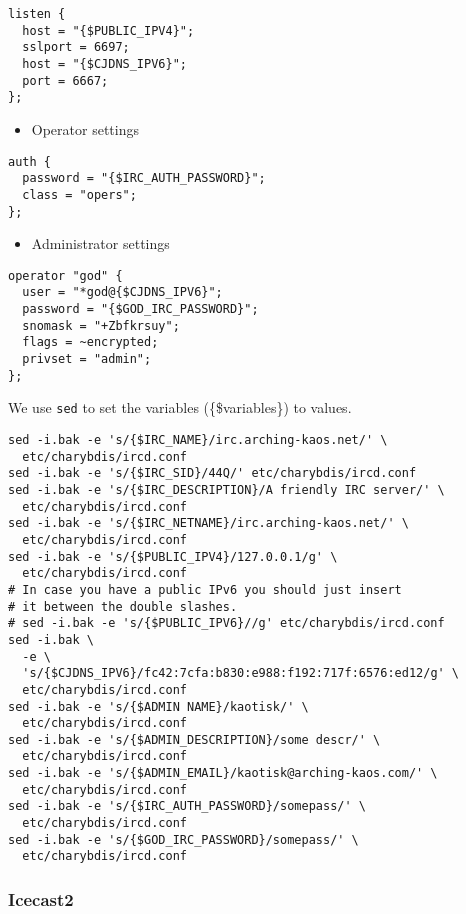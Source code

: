 \documentclass[12pt]{report}
\begin{document}
\begin{verbatim}
listen {
  host = "{$PUBLIC_IPV4}";
  sslport = 6697;
  host = "{$CJDNS_IPV6}";
  port = 6667;
};
\end{verbatim}

\begin{itemize}

\item
  Operator settings
\end{itemize}

\begin{verbatim}
auth {
  password = "{$IRC_AUTH_PASSWORD}";
  class = "opers";
};
\end{verbatim}

\begin{itemize}

\item
  Administrator settings
\end{itemize}

\begin{verbatim}
operator "god" {
  user = "*god@{$CJDNS_IPV6}";
  password = "{$GOD_IRC_PASSWORD}";
  snomask = "+Zbfkrsuy";
  flags = ~encrypted;
  privset = "admin";
};
\end{verbatim}

We use \texttt{sed} to set the variables (\{\$variables\}) to values.

\begin{verbatim}
sed -i.bak -e 's/{$IRC_NAME}/irc.arching-kaos.net/' \
  etc/charybdis/ircd.conf
sed -i.bak -e 's/{$IRC_SID}/44Q/' etc/charybdis/ircd.conf
sed -i.bak -e 's/{$IRC_DESCRIPTION}/A friendly IRC server/' \
  etc/charybdis/ircd.conf
sed -i.bak -e 's/{$IRC_NETNAME}/irc.arching-kaos.net/' \
  etc/charybdis/ircd.conf
sed -i.bak -e 's/{$PUBLIC_IPV4}/127.0.0.1/g' \
  etc/charybdis/ircd.conf
# In case you have a public IPv6 you should just insert 
# it between the double slashes.
# sed -i.bak -e 's/{$PUBLIC_IPV6}//g' etc/charybdis/ircd.conf
sed -i.bak \
  -e \
  's/{$CJDNS_IPV6}/fc42:7cfa:b830:e988:f192:717f:6576:ed12/g' \
  etc/charybdis/ircd.conf
sed -i.bak -e 's/{$ADMIN NAME}/kaotisk/' \
  etc/charybdis/ircd.conf
sed -i.bak -e 's/{$ADMIN_DESCRIPTION}/some descr/' \
  etc/charybdis/ircd.conf
sed -i.bak -e 's/{$ADMIN_EMAIL}/kaotisk@arching-kaos.com/' \
  etc/charybdis/ircd.conf
sed -i.bak -e 's/{$IRC_AUTH_PASSWORD}/somepass/' \
  etc/charybdis/ircd.conf
sed -i.bak -e 's/{$GOD_IRC_PASSWORD}/somepass/' \
  etc/charybdis/ircd.conf
\end{verbatim}


\subsubsection{Icecast2}\label{icecast2}
\end{document}
